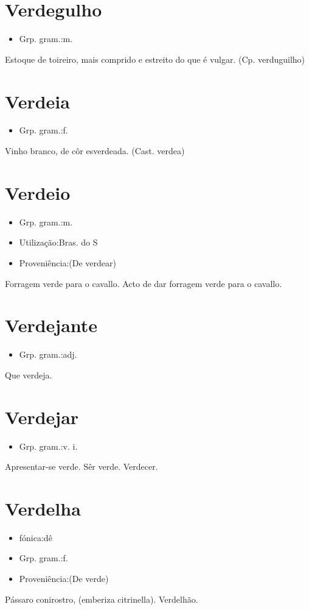 \documentclass{article}
\begin{document}
\section{Verdegulho}
\begin{itemize}
\item {Grp. gram.:m.}
\end{itemize}
Estoque de toireiro, mais comprido e estreito do que é vulgar.
(Cp. \textunderscore verduguilho\textunderscore )
\section{Verdeia}
\begin{itemize}
\item {Grp. gram.:f.}
\end{itemize}
Vinho branco, de côr esverdeada.
(Cast. \textunderscore verdea\textunderscore )
\section{Verdeio}
\begin{itemize}
\item {Grp. gram.:m.}
\end{itemize}
\begin{itemize}
\item {Utilização:Bras. do S}
\end{itemize}
\begin{itemize}
\item {Proveniência:(De \textunderscore verdear\textunderscore )}
\end{itemize}
Forragem verde para o cavallo.
Acto de dar forragem verde para o cavallo.
\section{Verdejante}
\begin{itemize}
\item {Grp. gram.:adj.}
\end{itemize}
Que verdeja.
\section{Verdejar}
\begin{itemize}
\item {Grp. gram.:v. i.}
\end{itemize}
Apresentar-se verde.
Sêr verde.
Verdecer.
\section{Verdelha}
\begin{itemize}
\item {fónica:dê}
\end{itemize}
\begin{itemize}
\item {Grp. gram.:f.}
\end{itemize}
\begin{itemize}
\item {Proveniência:(De \textunderscore verde\textunderscore )}
\end{itemize}
Pássaro conirostro, (\textunderscore emberiza citrinella\textunderscore ).
Verdelhão.
\end{document}
